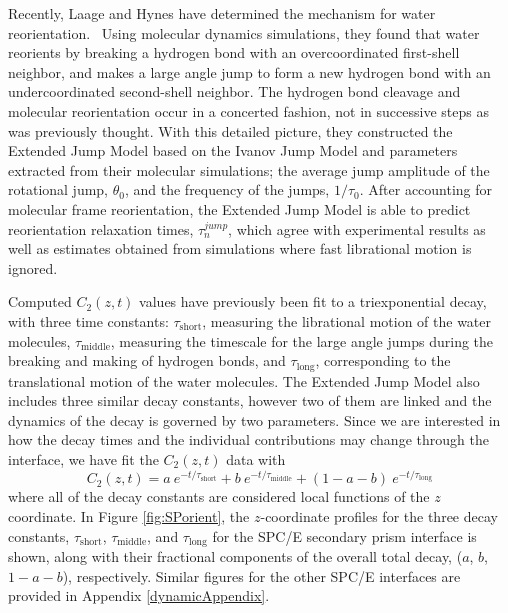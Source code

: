 Recently, Laage and Hynes have determined the mechanism for water
reorientation.~\cite{Laage2006,Laage2008} Using molecular dynamics
simulations, they found that water reorients by breaking a hydrogen
bond with an overcoordinated first-shell neighbor, and makes a large
angle jump to form a new hydrogen bond with an undercoordinated
second-shell neighbor. The hydrogen bond cleavage and molecular
reorientation occur in a concerted fashion, not in successive steps as
was previously thought. With this detailed picture, they constructed
the Extended Jump Model\cite{Laage2006,Laage2008} based on the Ivanov
Jump Model and parameters extracted from their molecular simulations;
the average jump amplitude of the rotational jump, $\theta_{0}$, and
the frequency of the jumps, $1/\tau_{0}$. After accounting for
molecular frame reorientation, the Extended Jump Model is able to
predict reorientation relaxation times, $\tau_{n}^{jump}$, which agree
with experimental results as well as estimates obtained from
simulations where fast librational motion is ignored.

Computed $C_2(z,t)$ values have previously been fit to a
triexponential decay, with three time constants:
$\tau_\mathrm{short}$, measuring the librational motion of the water
molecules, $\tau_\mathrm{middle}$, measuring the timescale for the
large angle jumps during the breaking and making of hydrogen bonds,
and $\tau_\mathrm{long}$, corresponding to the translational motion of
the water molecules.\cite{Louden2013a} The Extended Jump Model also
includes three similar decay constants, however two of them are linked
and the dynamics of the decay is governed by two parameters. Since we
are interested in how the decay times and the individual contributions
may change through the interface, we have fit the $C_2(z,t)$ data
with
\begin{equation}
  C_{2}(z,t) = a~e^{-t/\tau_\mathrm{short}} + b~e^{-t/\tau_\mathrm{middle}} + 
  (1-a-b)~e^{-t/\tau_\mathrm{long}}
\label{eq:c2}
\end{equation}
where all of the decay constants are considered local functions of the
$z$ coordinate. In Figure \ref{fig:SPorient}, the $z$-coordinate
profiles for the three decay constants, $\tau_{\mathrm{short}}$,
$\tau_{\mathrm{middle}}$, and $\tau_{\mathrm{long}}$ for the SPC/E
secondary prism interface is shown, along with their fractional
components of the overall total decay, ($a$, $b$, $1-a-b$),
respectively. Similar figures for the other SPC/E interfaces are provided in
Appendix \ref{dynamicAppendix}.

